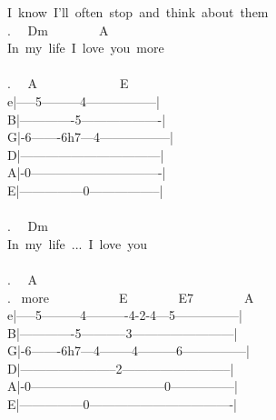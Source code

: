 {I\ know\ I'll\ often\ stop\ and\ think\ about\ them\\
. \ \ Dm\ \ \ \ \ \ \ \ A\\
In\ my\ life\ I\ love\ you\ more\\
\\
. \ \ A\ \ \ \ \ \ \ \ \ \ \ \ \ E\\
e|-----5---------4-----------------|\\
B|-------------5-------------------|\\
G|-6-------6h7---4-----------------|\\
D|---------------------------------|\\
A|-0-------------------------------|\\
E|---------------0-----------------|\\
\\
. \ \ Dm\\
In\ my\ life\ ...\ I\ love\ you\\
\\
. \ \ A\\
. \ more\ \ \ \ \ \ \ \ \ \ \ E\ \ \ \ \ \ \ \ E7\ \ \ \ \ \ \ \ A\\
e|-----5---------4----------4-2-4---5---------------|\\
B|-------------5-----------3------------------------|\\
G|-6-------6h7---4--------4---------6---------------|\\
D|-----------------------2--------------------------|\\
A|-0--------------------------------0---------------|\\
E|---------------0----------------------------------|}
